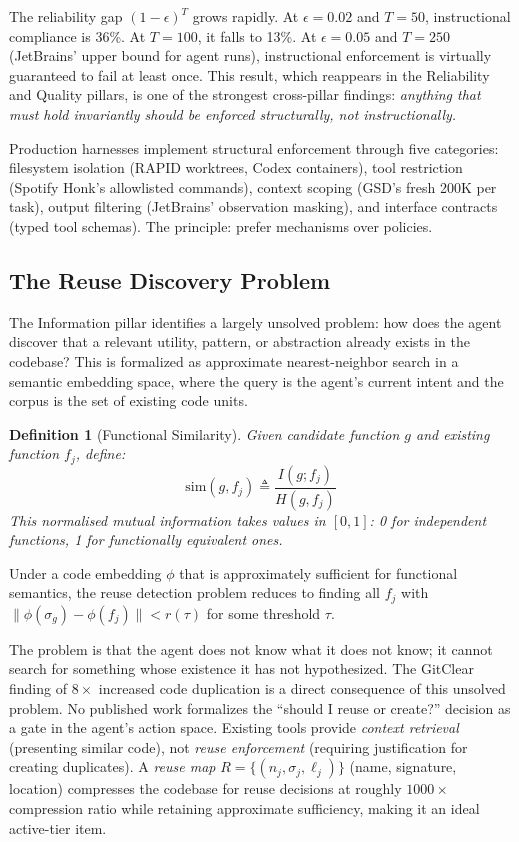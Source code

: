 \documentclass[11pt, a4paper, logo, copyright]{googledeepmind}
\newtheorem{definition}{Definition}[section]
\begin{document}
The reliability gap $(1-\epsilon)^T$ grows rapidly. At $\epsilon = 0.02$ and $T = 50$, instructional compliance is 36\%. At $T = 100$, it falls to 13\%. At $\epsilon = 0.05$ and $T = 250$ (JetBrains' upper bound for agent runs), instructional enforcement is virtually guaranteed to fail at least once. This result, which reappears in the Reliability and Quality pillars, is one of the strongest cross-pillar findings: \emph{anything that must hold invariantly should be enforced structurally, not instructionally.}

Production harnesses implement structural enforcement through five categories: filesystem isolation (RAPID worktrees, Codex containers), tool restriction (Spotify Honk's allowlisted commands), context scoping (GSD's fresh 200K per task), output filtering (JetBrains' observation masking), and interface contracts (typed tool schemas). The principle: prefer mechanisms over policies.

\subsection{The Reuse Discovery Problem}

The Information pillar identifies a largely unsolved problem: how does the agent discover that a relevant utility, pattern, or abstraction already exists in the codebase? This is formalized as approximate nearest-neighbor search in a semantic embedding space, where the query is the agent's current intent and the corpus is the set of existing code units.

\begin{definition}[Functional Similarity]
Given candidate function $g$ and existing function $f_j$, define:
\begin{equation}
    \text{sim}(g, f_j) \triangleq \frac{I(g; f_j)}{H(g, f_j)}
\end{equation}
This normalised mutual information takes values in $[0,1]$: 0 for independent functions, 1 for functionally equivalent ones.
\end{definition}

Under a code embedding $\phi$ that is approximately sufficient for functional semantics, the reuse detection problem reduces to finding all $f_j$ with $\|\phi(\sigma_g) - \phi(f_j)\| < r(\tau)$ for some threshold $\tau$.

The problem is that the agent does not know what it does not know; it cannot search for something whose existence it has not hypothesized. The GitClear finding of $8\times$ increased code duplication \citep{gitclear2025} is a direct consequence of this unsolved problem. No published work formalizes the ``should I reuse or create?'' decision as a gate in the agent's action space. Existing tools provide \emph{context retrieval} (presenting similar code), not \emph{reuse enforcement} (requiring justification for creating duplicates). A \emph{reuse map} $R = \{(n_j, \sigma_j, \ell_j)\}$ (name, signature, location) compresses the codebase for reuse decisions at roughly $1000\times$ compression ratio while retaining approximate sufficiency, making it an ideal active-tier item.
\end{document}
